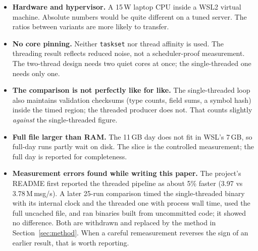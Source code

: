 \documentclass[10pt,a4paper]{article}
\newcommand{\code}[1]{\texttt{#1}}
\begin{document}
\begin{itemize}
  \item \textbf{Hardware and hypervisor.} A 15\,W laptop CPU inside a WSL2 virtual machine. Absolute numbers would be
        quite different on a tuned server. The ratios between variants are more likely to transfer.
  \item \textbf{No core pinning.} Neither \code{taskset} nor thread affinity is used. The threading result reflects reduced
        noise, not a scheduler-proof measurement. The two-thread design needs two quiet cores at once; the single-threaded one needs only one.
  \item \textbf{The comparison is not perfectly like for like.} The single-threaded loop also maintains validation checksums (type
        counts, field sums, a symbol hash) inside the timed region; the threaded producer does not. That counts slightly \emph{against}
        the single-threaded figure.
  \item \textbf{Full file larger than RAM.} The 11\,GB day does not fit in WSL's 7\,GB, so full-day runs partly wait on disk.
        The slice is the controlled measurement; the full day is reported for completeness.
  \item \textbf{Measurement errors found while writing this paper.} The project's README first reported the threaded
        pipeline as about 5\% faster (3.97 vs 3.78\,M\,msg/s). A later 25-run comparison timed the single-threaded binary with its
        internal clock and the threaded one with process wall time, used the full uncached file, and ran binaries built from uncommitted code;
        it showed no difference. Both are withdrawn and replaced by the method in Section~\ref{sec:method}.
        When a careful remeasurement reverses the sign of an earlier result, that is worth reporting.


\end{itemize}
\end{document}

